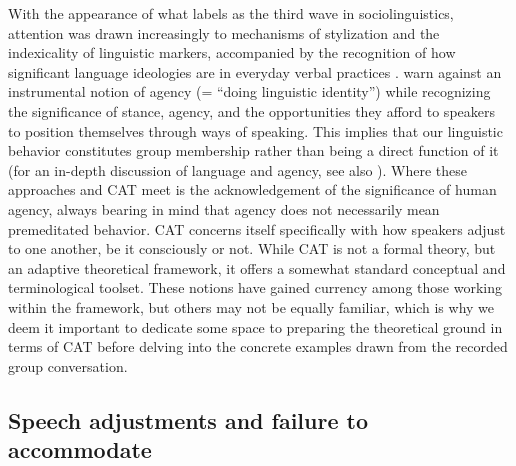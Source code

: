 \documentclass[output=paper,colorlinks,citecolor=brown]{langscibook}
\begin{document}
With the appearance of what \citet{eckert2012} labels as the third wave in sociolinguistics, attention was drawn increasingly to mechanisms of stylization and the indexicality of linguistic markers, accompanied by the recognition of how significant language ideologies are in everyday verbal practices \citep{kroskrity2010,spitzmuller_busch_flubacher2021}. \citet[6--7]{levon_mendes2016} warn against an instrumental notion of agency (= ``doing linguistic identity'') while recognizing the significance of stance, agency, and the opportunities they afford to speakers to position themselves through ways of speaking. This implies that our linguistic behavior constitutes group membership rather than being a direct function of it (for an in-depth discussion of language and agency, see also \citealt{duranti2005}). Where these approaches and CAT meet is the acknowledgement of the significance of human agency, always bearing in mind that agency does not necessarily mean premeditated behavior. CAT concerns itself specifically with how speakers adjust to one another, be it consciously or not. While CAT is not a formal theory, but an adaptive theoretical framework, it offers a somewhat standard conceptual and terminological toolset. These notions have gained currency among those working within the framework, but others may not be equally familiar, which is why we deem it important to dedicate some space to preparing the theoretical ground in terms of CAT before delving into the concrete examples drawn from the recorded group conversation. 

\subsection{Speech adjustments and failure to accommodate}\label{CH1.1.ss.3.2}
\end{document}
